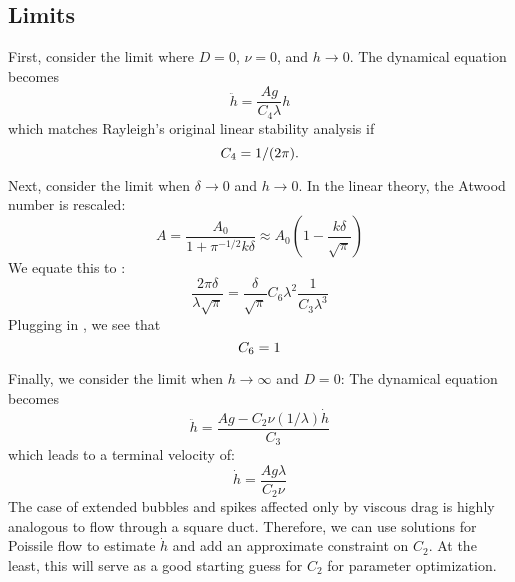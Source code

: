 \subsection{Limits}
First, consider the limit where $D = 0$, $\nu = 0$, and $h \rightarrow 0$.
The dynamical equation becomes
\begin{equation}
\ddot{h} = \frac{A g }{C_4 \lambda} h
\end{equation}
which matches Rayleigh's original linear stability analysis if 
\begin{equation} \elabel{c4}
C_4 = 1/(2 \pi).
\end{equation}

Next, consider the limit when $\delta \rightarrow 0 $ and $h \rightarrow 0$.
In the linear theory, the Atwood number is rescaled:
\begin{equation}
A = \frac{A_0}{1 + \pi^{-1/2} k \delta} \approx A_0 \left(1 - \frac{k \delta}{\sqrt{\pi}}\right)
\end{equation}
We equate this to :
\begin{equation}
\frac{2 \pi \delta}{\lambda \sqrt{\pi}} = \frac{\delta}{\sqrt{\pi}} C_6 \lambda^2 \frac{1}{C_3 \lambda^3}
\end{equation}
Plugging in , we see that
\begin{equation} \elabel{c6}
C_6 = 1
\end{equation}

Finally, we consider the limit when $h \rightarrow \infty$ and $D = 0$:
The dynamical equation becomes
\begin{equation}
\ddot{h} = \frac{A g - C_2 \nu (1/\lambda) \dot{h}}{C_3}
\end{equation}
which leads to a terminal velocity of:
\begin{equation}
\dot{h} = \frac{A g \lambda}{C_2 \nu}
\end{equation}
The case of extended bubbles and spikes affected only by viscous drag is highly analogous to flow through a square duct.
Therefore, we can use solutions for Poissile flow to estimate $\dot{h}$ and add an approximate constraint on $C_2$.
At the least, this will serve as a good starting guess for $C_2$ for parameter optimization.

\begin{comment}
Next, consider the limit where $D = 0$ and $h \rightarrow 0$.
The dynamical equation becomes:
\begin{equation}
\ddot{h} = \left[\frac{C_0 A g }{C_3 \lambda} - C_2 \nu \dot{h}/\lambda \right] h
\end{equation}
In the spirit of the linear growth model, assume the interface grows as $h(t) = a_0 \cosh[\gamma t] $, with
\begin{equation}
\gamma = \frac{C_0 A g }{C_3 \lambda} - C_2 \nu \dot{h}/\lambda 
\end{equation}
The velocity is given by $\dot{h} = a_0 \gamma \sinh[\gamma t] = \gamma \tanh[\gamma t] h$, yielding:
\begin{equation}
\gamma = \frac{C_0 A g }{C_3 \lambda} - \gamma C_2 \tanh[\gamma t] h \nu /\lambda 
\end{equation}
\end{comment}
